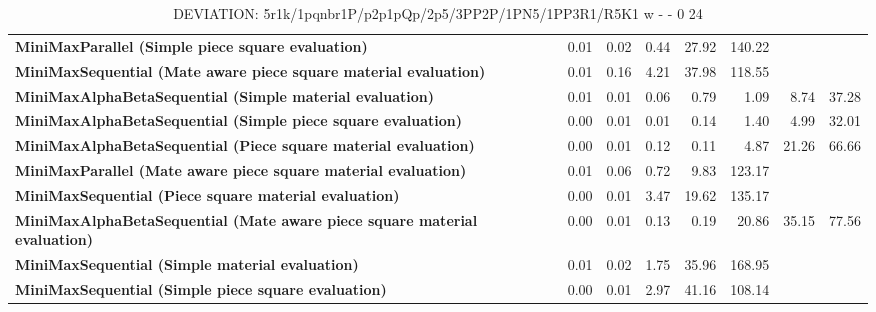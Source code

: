\begin{table}[H]
{\begin{tabular}{|p{8cm}|*{7}{r|}}
\rowcolor[HTML]{FFFFFF}
\textbf{MiniMaxParallel (Simple piece square evaluation)}               & 0.01 & 0.02 & 0.44 & 27.92 & 140.22 &  &  \\

\rowcolor[HTML]{EFEFEF}
\textbf{MiniMaxSequential (Mate aware piece square material evaluation)}               & 0.01 & 0.16 & 4.21 & 37.98 & 118.55 &  &  \\

\rowcolor[HTML]{FFFFFF}
\textbf{MiniMaxAlphaBetaSequential (Simple material evaluation)}               & 0.01 & 0.01 & 0.06 & 0.79 & 1.09 & 8.74 & 37.28 \\

\rowcolor[HTML]{EFEFEF}
\textbf{MiniMaxAlphaBetaSequential (Simple piece square evaluation)}               & 0.00 & 0.01 & 0.01 & 0.14 & 1.40 & 4.99 & 32.01 \\

\rowcolor[HTML]{FFFFFF}
\textbf{MiniMaxAlphaBetaSequential (Piece square material evaluation)}               & 0.00 & 0.01 & 0.12 & 0.11 & 4.87 & 21.26 & 66.66 \\

\rowcolor[HTML]{EFEFEF}
\textbf{MiniMaxParallel (Mate aware piece square material evaluation)}               & 0.01 & 0.06 & 0.72 & 9.83 & 123.17 &  &  \\

\rowcolor[HTML]{FFFFFF}
\textbf{MiniMaxSequential (Piece square material evaluation)}               & 0.00 & 0.01 & 3.47 & 19.62 & 135.17 &  &  \\

\rowcolor[HTML]{EFEFEF}
\textbf{MiniMaxAlphaBetaSequential (Mate aware piece square material evaluation)}               & 0.00 & 0.01 & 0.13 & 0.19 & 20.86 & 35.15 & 77.56 \\

\rowcolor[HTML]{FFFFFF}
\textbf{MiniMaxSequential (Simple material evaluation)}               & 0.01 & 0.02 & 1.75 & 35.96 & 168.95 &  &  \\

\rowcolor[HTML]{EFEFEF}
\textbf{MiniMaxSequential (Simple piece square evaluation)}               & 0.00 & 0.01 & 2.97 & 41.16 & 108.14 &  &  \\

            \hline
        \end{tabular}%
    }
    \caption{DEVIATION: 5r1k/1pqnbr1P/p2p1pQp/2p5/3PP2P/1PN5/1PP3R1/R5K1 w - - 0 24}
    \label{tab:mid-game---promotion---mate-in-2---short-deviation}
\end{table}
